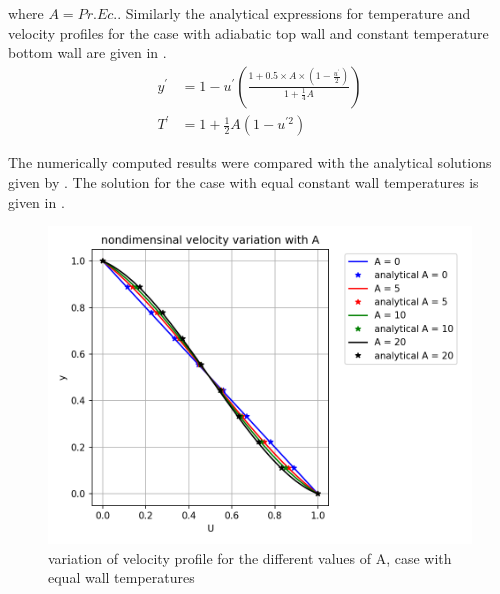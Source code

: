 \par where \(A = Pr. Ec.\). Similarly the analytical expressions for temperature and velocity profiles
for the case with adiabatic top wall and constant temperature bottom wall are
given in .
\begin{align}
    y^\prime &= 1 - u^\prime\left(\frac{1 + 0.5 \times A \times \left(1 - \frac{u^\prime}{2}\right)}{1 + \frac{1}{4}A}\right) \label{u_A_aw_eqn} \\
    T^\prime &= 1 + \frac{1}{2} A \left(1 - u^{\prime 2}\right) \label{t_A_aw_eqn}
\end{align}

\par The numerically computed results were compared with the analytical solutions
given by . The solution
for the case with equal constant wall temperatures is given in .

\begin{figure}[!h]
   \centering
    \includegraphics[scale=0.6]{supporting_documents/01_equalWallTemperatures/U_profiles.png}
    \caption{variation of velocity profile for the different values of A, case with equal wall temperatures}
    \label{sol_ewt_u}
\end{figure}

